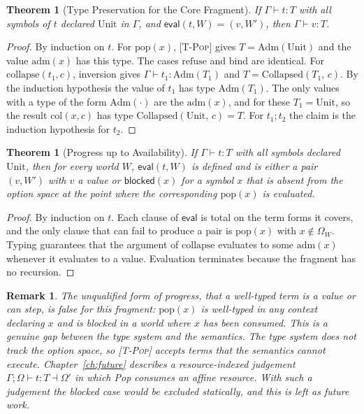 \documentclass[12pt,oneside,openany]{book}
\theoremstyle{spherepop}
\newtheorem{theorem}[definition]{Theorem}
\theoremstyle{remarkstyle}
\newtheorem{remark}[definition]{Remark}
\newcommand{\Adm}[1]{\mathrm{Adm}(#1)}
\newcommand{\Collapsed}[2]{\mathrm{Collapsed}(#1,\,#2)}
\newcommand{\eval}{\mathsf{eval}}
\newcommand{\blocked}{\mathsf{blocked}}
\begin{document}
\begin{theorem}[Type Preservation for the Core Fragment]
\label{thm:preservation}
If $\Gamma\vdash t:T$ with all symbols of $t$ declared $\mathrm{Unit}$ in $\Gamma$, and $\eval(t,W)=(v,W')$, then $\Gamma\vdash v:T$.
\end{theorem}

\begin{proof}
By induction on $t$. For $\mathrm{pop}(x)$, \textsc{[T-Pop]} gives $T=\Adm{\mathrm{Unit}}$ and the value $\mathrm{adm}(x)$ has this type. The cases $\mathrm{refuse}$ and $\mathrm{bind}$ are identical. For $\mathrm{collapse}(t_1,c)$, inversion gives $\Gamma\vdash t_1:\Adm{T_1}$ and $T=\Collapsed{T_1}{c}$. By the induction hypothesis the value of $t_1$ has type $\Adm{T_1}$. The only values with a type of the form $\Adm{\cdot}$ are the $\mathrm{adm}(x)$, and for these $T_1=\mathrm{Unit}$, so the result $\mathrm{col}(x,c)$ has type $\Collapsed{\mathrm{Unit}}{c}=T$. For $t_1;t_2$ the claim is the induction hypothesis for $t_2$.
\end{proof}

\begin{theorem}[Progress up to Availability]
\label{thm:progress}
If $\Gamma\vdash t:T$ with all symbols declared $\mathrm{Unit}$, then for every world $W$, $\eval(t,W)$ is defined and is either a pair $(v,W')$ with $v$ a value or $\blocked(x)$ for a symbol $x$ that is absent from the option space at the point where the corresponding $\mathrm{pop}(x)$ is evaluated.
\end{theorem}

\begin{proof}
By induction on $t$. Each clause of $\eval$ is total on the term forms it covers, and the only clause that can fail to produce a pair is $\mathrm{pop}(x)$ with $x\notin\Omega_W$. Typing guarantees that the argument of $\mathrm{collapse}$ evaluates to some $\mathrm{adm}(x)$ whenever it evaluates to a value. Evaluation terminates because the fragment has no recursion.
\end{proof}

\begin{remark}
The unqualified form of progress, that a well-typed term is a value or can step, is false for this fragment: $\mathrm{pop}(x)$ is well-typed in any context declaring $x$ and is blocked in a world where $x$ has been consumed. This is a genuine gap between the type system and the semantics. The type system does not track the option space, so \textsc{[T-Pop]} accepts terms that the semantics cannot execute. Chapter~\ref{ch:future} describes a resource-indexed judgement $\Gamma;\Omega\vdash t:T\dashv\Omega'$ in which Pop consumes an affine resource. With such a judgement the blocked case would be excluded statically, and this is left as future work.
\end{remark}
\end{document}
